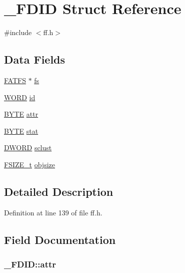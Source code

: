 \hypertarget{struct__FDID}{}\section{\+\_\+\+F\+D\+ID Struct Reference}
\label{struct__FDID}


{\ttfamily \#include $<$ff.\+h$>$}

\subsection*{Data Fields}
\begin{DoxyCompactItemize}
\item 
\hyperlink{structFATFS}{F\+A\+T\+FS} $\ast$ \hyperlink{struct__FDID_aefa4597d88e54bace32e6c15e11d9610}{fs}
\item 
\hyperlink{integer_8h_a197942eefa7db30960ae396d68339b97}{W\+O\+RD} \hyperlink{struct__FDID_a363d7bdab408418b911ac1502bc22ea6}{id}
\item 
\hyperlink{integer_8h_a4ae1dab0fb4b072a66584546209e7d58}{B\+Y\+TE} \hyperlink{struct__FDID_a6912cfc1ea914d7b68a18b846065d790}{attr}
\item 
\hyperlink{integer_8h_a4ae1dab0fb4b072a66584546209e7d58}{B\+Y\+TE} \hyperlink{struct__FDID_a1a2ff09f2ef172772f4e7312070be708}{stat}
\item 
\hyperlink{integer_8h_ad342ac907eb044443153a22f964bf0af}{D\+W\+O\+RD} \hyperlink{struct__FDID_ae2fbaaa31b5d12b333cb6d1ded099412}{sclust}
\item 
\hyperlink{ff_8h_a3fc0992ad7436250b6b1a0592214b7f2}{F\+S\+I\+Z\+E\+\_\+t} \hyperlink{struct__FDID_a27039b8d89a4a62efabab36e6b303819}{objsize}
\end{DoxyCompactItemize}


\subsection{Detailed Description}


Definition at line 139 of file ff.\+h.



\subsection{Field Documentation}
\subsubsection[{\texorpdfstring{attr}{attr}}]{ \+\_\+\+F\+D\+I\+D\+::attr}\hypertarget{struct__FDID_a6912cfc1ea914d7b68a18b846065d790}{}\label{struct__FDID_a6912cfc1ea914d7b68a18b846065d790}


